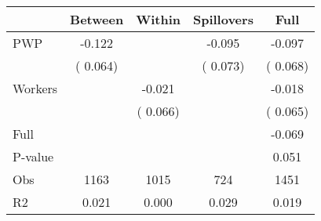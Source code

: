 
\begin{tabular}{l*{4}{c}}\hline&\multicolumn{1}{c}{Between}&\multicolumn{1}{c}{Within}&\multicolumn{1}{c}{Spillovers}&\multicolumn{1}{c}{Full}\\ \hline
 PWP           &             -0.122      &                                               &       -0.095 &        -0.097                            \\ 
                               &        (       0.064)           &                                       &       (       0.073)     &      (       0.068)                                           \\ 
 Workers       &                                               &       -0.021    &                                &            -0.018                            \\ 
                               &                                               & (       0.066)                  &                                        &      (       0.065)                                           \\ 
\hline                                                                                                                                                                                                                                            
 Full                  &                                               &                                               &                                        &            -0.069                                     \\ 
 P-value               &                                               &                                               &                                        &             0.051                                           \\ 
 Obs                   &               1163               &       1015                       &       724                &              1451                                               \\ 
 R2                    &                      0.021              &              0.000                      &              0.029               &                     0.019                                              \\ 
\hline \end{tabular}                                                                                                                                                                                                              